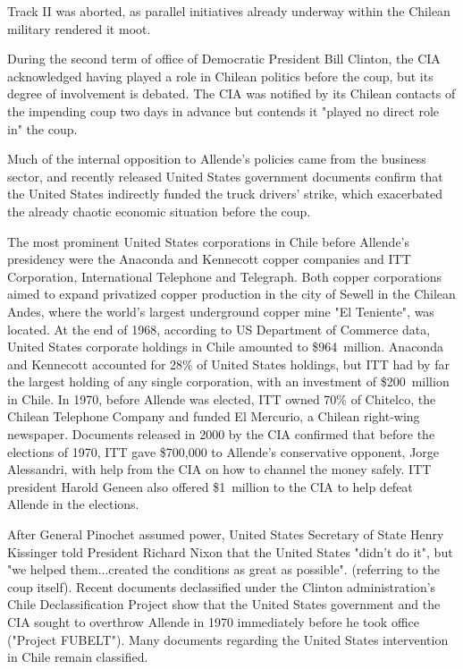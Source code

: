 Track II was aborted, as parallel initiatives already underway within
the Chilean military rendered it moot.

During the second term of office of Democratic President Bill Clinton,
the CIA acknowledged having played a role in Chilean politics before the
coup, but its degree of involvement is debated. The CIA was notified by
its Chilean contacts of the impending coup two days in advance but
contends it "played no direct role in" the coup.

Much of the internal opposition to Allende's policies came from the
business sector, and recently released United States government
documents confirm that the United States indirectly funded the truck
drivers' strike, which exacerbated the already chaotic economic
situation before the coup.

The most prominent United States corporations in Chile before Allende's
presidency were the Anaconda and Kennecott copper companies and ITT
Corporation, International Telephone and Telegraph. Both copper
corporations aimed to expand privatized copper production in the city of
Sewell in the Chilean Andes, where the world's largest underground
copper mine "El Teniente", was located. At the end of 1968, according to
US Department of Commerce data, United States corporate holdings in
Chile amounted to \$964~million. Anaconda and Kennecott accounted for
28\% of United States holdings, but ITT had by far the largest holding
of any single corporation, with an investment of \$200~million in Chile.
In 1970, before Allende was elected, ITT owned 70\% of Chitelco, the
Chilean Telephone Company and funded El Mercurio, a Chilean right-wing
newspaper. Documents released in 2000 by the CIA confirmed that before
the elections of 1970, ITT gave \$700,000 to Allende's conservative
opponent, Jorge Alessandri, with help from the CIA on how to channel the
money safely. ITT president Harold Geneen also offered \$1~million to
the CIA to help defeat Allende in the elections.

After General Pinochet assumed power, United States Secretary of State
Henry Kissinger told President Richard Nixon that the United States
"didn't do it", but "we helped them...created the conditions as great as
possible". (referring to the coup itself). Recent documents declassified
under the Clinton administration's Chile Declassification Project show
that the United States government and the CIA sought to overthrow
Allende in 1970 immediately before he took office ("Project FUBELT").
Many documents regarding the United States intervention in Chile remain
classified.

